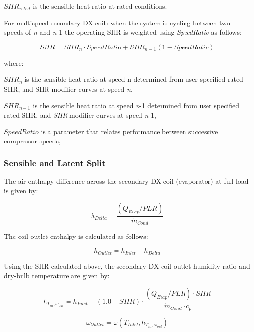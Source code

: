 \(SHR_{rated}\) is the sensible heat ratio at rated conditions.

For multispeed secondary DX coils when the system is cycling between two speeds of \emph{n} and \emph{n}-1 the operating SHR is weighted using \emph{SpeedRatio} as follows:

\begin{equation}
SHR = SHR_n \cdot SpeedRatio +  SHR_{n-1} (1 - SpeedRatio)
\end{equation}

where:

\(SHR_n\) is the sensible heat ratio at speed n determined from user specified rated SHR, and SHR modifier curves at speed \emph{n},

\(SHR_{n-1}\) is the sensible heat ratio at speed \emph{n}-1 determined from user specified rated SHR, and \emph{SHR} modifier curves at speed \emph{n}-1,

\(SpeedRatio\) is a parameter that relates performance between successive compressor speeds,

\subsubsection{Sensible and Latent Split}\label{sensible-and-latent-split}

The air enthalpy difference across the secondary DX coil (evaporator) at full load is given by:

\begin{equation}
  h_{Delta} = \frac{\left(Q_{Evap}/PLR\right)}{\dot{m}_{Cond}}
\end{equation}

The coil outlet enthalpy is calculated as follows:

\begin{equation}
  h_{Outlet} = h_{Inlet}-h_{Delta}
\end{equation}

Using the SHR calculated above, the secondary DX coil outlet humidity ratio and dry-bulb temperature are given by:

\begin{equation}
  h_{T_{in},\omega_{out}} = h_{Inlet} - \left(1.0 - SHR\right) \cdot \frac{\left(Q_{Evap}/PLR\right)\cdot SHR}{\dot{m}_{Cond}\cdot c_p}
\end{equation}

\begin{equation}
  \omega_{Outlet} = \omega( T_{Inlet}, h_{T_{in},\omega_{out}} )
\end{equation}

